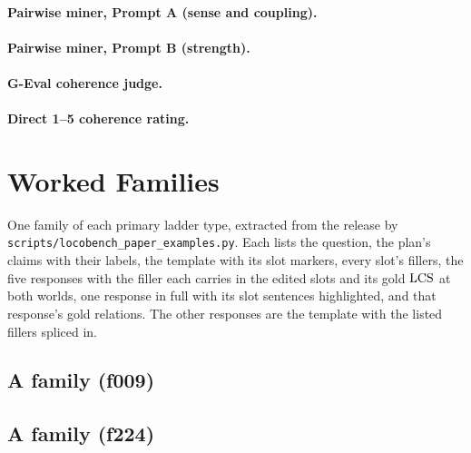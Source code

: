 \paragraph{Pairwise miner, Prompt A (sense and coupling).}

\paragraph{Pairwise miner, Prompt B (strength).}

\paragraph{G-Eval coherence judge.}

\paragraph{Direct 1--5 coherence rating.}

\section{Worked Families}
\label{app:families}

One family of each primary ladder type, extracted from the release by
\texttt{scripts/locobench\_paper\_examples.py}. Each lists the question, the plan's claims with
their labels, the template with its slot markers, every slot's fillers, the five responses with
the filler each carries in the edited slots and its gold $\mathrm{LCS}$ at both worlds, one response in
full with its slot sentences highlighted, and that response's gold relations. The other responses
are the template with the listed fillers spliced in.

\subsection{A  family (f009)}


\subsection{A  family (f224)}


